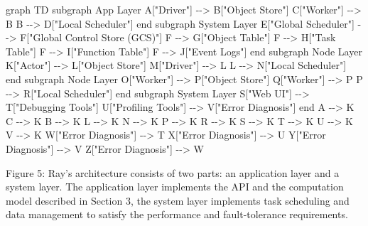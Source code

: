 \documentclass[
]{article}
\newenvironment{Shaded}{}{}
\newcommand{\NormalTok}[1]{#1}
\begin{document}
\begin{Shaded}
\begin{Highlighting}[]
\NormalTok{graph TD}
\NormalTok{    subgraph App Layer}
\NormalTok{        A["Driver"] {-}{-}\textgreater{} B["Object Store"]}
\NormalTok{        C["Worker"] {-}{-}\textgreater{} B}
\NormalTok{        B {-}{-}\textgreater{} D["Local Scheduler"]}
\NormalTok{    end}
\NormalTok{    subgraph System Layer}
\NormalTok{        E["Global Scheduler"] {-}{-}\textgreater{} F["Global Control Store (GCS)"]}
\NormalTok{        F {-}{-}\textgreater{} G["Object Table"]}
\NormalTok{        F {-}{-}\textgreater{} H["Task Table"]}
\NormalTok{        F {-}{-}\textgreater{} I["Function Table"]}
\NormalTok{        F {-}{-}\textgreater{} J["Event Logs"]}
\NormalTok{    end}
\NormalTok{    subgraph Node Layer}
\NormalTok{        K["Actor"] {-}{-}\textgreater{} L["Object Store"]}
\NormalTok{        M["Driver"] {-}{-}\textgreater{} L}
\NormalTok{        L {-}{-}\textgreater{} N["Local Scheduler"]}
\NormalTok{    end}
\NormalTok{    subgraph Node Layer}
\NormalTok{        O["Worker"] {-}{-}\textgreater{} P["Object Store"]}
\NormalTok{        Q["Worker"] {-}{-}\textgreater{} P}
\NormalTok{        P {-}{-}\textgreater{} R["Local Scheduler"]}
\NormalTok{    end}
\NormalTok{    subgraph System Layer}
\NormalTok{        S["Web UI"] {-}{-}\textgreater{} T["Debugging Tools"]}
\NormalTok{        U["Profiling Tools"] {-}{-}\textgreater{} V["Error Diagnosis"]}
\NormalTok{    end}
\NormalTok{    A {-}{-}\textgreater{} K}
\NormalTok{    C {-}{-}\textgreater{} K}
\NormalTok{    B {-}{-}\textgreater{} K}
\NormalTok{    L {-}{-}\textgreater{} K}
\NormalTok{    N {-}{-}\textgreater{} K}
\NormalTok{    P {-}{-}\textgreater{} K}
\NormalTok{    R {-}{-}\textgreater{} K}
\NormalTok{    S {-}{-}\textgreater{} K}
\NormalTok{    T {-}{-}\textgreater{} K}
\NormalTok{    U {-}{-}\textgreater{} K}
\NormalTok{    V {-}{-}\textgreater{} K}
\NormalTok{    W["Error Diagnosis"] {-}{-}\textgreater{} T}
\NormalTok{    X["Error Diagnosis"] {-}{-}\textgreater{} U}
\NormalTok{    Y["Error Diagnosis"] {-}{-}\textgreater{} V}
\NormalTok{    Z["Error Diagnosis"] {-}{-}\textgreater{} W}
\end{Highlighting}
\end{Shaded}

Figure 5: Ray's architecture consists of two parts: an application layer
and a system layer. The application layer implements the API and the
computation model described in Section 3, the system layer implements
task scheduling and data management to satisfy the performance and
fault-tolerance requirements.
\end{document}
